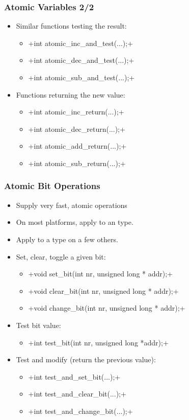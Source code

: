 \begin{frame}[fragile]
  \frametitle{Atomic Variables 2/2}
  \begin{itemize}
  \item Similar functions testing the result:
    \begin{itemize}
    \item {}+int atomic_inc_and_test(...);+
    \item {}+int atomic_dec_and_test(...);+
    \item {}+int atomic_sub_and_test(...);+
    \end{itemize}
  \item Functions returning the new value:
    \begin{itemize}
    \item {}+int atomic_inc_return(...);+
    \item {}+int atomic_dec_return(...);+
    \item {}+int atomic_add_return(...);+
    \item {}+int atomic_sub_return(...);+
    \end{itemize}
  \end{itemize}
\end{frame}

\begin{frame}[fragile]
  \frametitle{Atomic Bit Operations}
  \begin{itemize}
  \item Supply very fast, atomic operations
  \item On most platforms, apply to an  type.
  \item Apply to a  type on a few others.
  \item Set, clear, toggle a given bit:
    \begin{itemize}
    \item {}+void set_bit(int nr, unsigned long * addr);+
    \item {}+void clear_bit(int nr, unsigned long * addr);+
    \item {}+void change_bit(int nr, unsigned long * addr);+
    \end{itemize}
  \item Test bit value:
    \begin{itemize}
    \item {}+int test_bit(int nr, unsigned long *addr);+
    \end{itemize}
  \item Test and modify (return the previous value):
    \begin{itemize}
    \item {}+int test_and_set_bit(...);+
    \item {}+int test_and_clear_bit(...);+
    \item {}+int test_and_change_bit(...);+
    \end{itemize}
  \end{itemize}
\end{frame}

